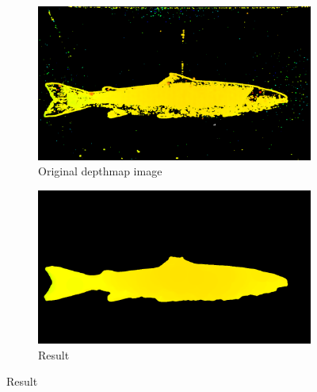 \begin{figure}[H]
    \medskip
    \begin{subfigure}{0.49\textwidth}
        \includegraphics[width=\linewidth]{images/results/algorithm_test/original_73}
        \caption{Original depthmap image} 
        \label{fig:original_depthmap_73}
    \end{subfigure}\hspace*{\fill}
    \begin{subfigure}{0.49\textwidth}
        \includegraphics[width=\linewidth]{images/results/algorithm_test/median_filter_63}
        \caption{Result} 
        \label{fig:result_73}
    \end{subfigure}
    

\end{figure}
